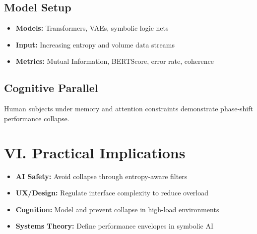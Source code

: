 \documentclass[12pt]{article}
\begin{document}
\subsection*{Model Setup}

\begin{itemize}
  \item \textbf{Models:} Transformers, VAEs, symbolic logic nets
  \item \textbf{Input:} Increasing entropy and volume data streams
  \item \textbf{Metrics:} Mutual Information, BERTScore, error rate, coherence
\end{itemize}

\subsection*{Cognitive Parallel}

Human subjects under memory and attention constraints demonstrate phase-shift performance collapse.

\section*{VI. Practical Implications}

\begin{itemize}
  \item \textbf{AI Safety:} Avoid collapse through entropy-aware filters
  \item \textbf{UX/Design:} Regulate interface complexity to reduce overload
  \item \textbf{Cognition:} Model and prevent collapse in high-load environments
  \item \textbf{Systems Theory:} Define performance envelopes in symbolic AI
\end{itemize}
\end{document}
